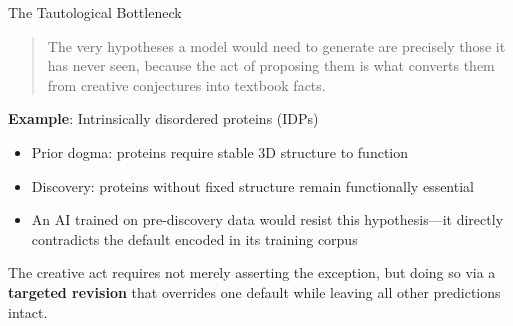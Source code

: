 \documentclass[aspectratio=169]{beamer}
\begin{document}
\begin{frame}{The Tautological Bottleneck}

\begin{quote}
The very hypotheses a model would need to generate are precisely those it has never seen, because the act of proposing them is what converts them from creative conjectures into textbook facts.
\end{quote}

\vspace{0.8em}
\textbf{Example}: Intrinsically disordered proteins (IDPs)

\begin{itemize}
    \item Prior dogma: proteins require stable 3D structure to function
    \item Discovery: proteins without fixed structure remain functionally essential
    \item An AI trained on pre-discovery data would resist this hypothesis---it directly contradicts the default encoded in its training corpus
\end{itemize}

\vspace{0.8em}
The creative act requires not merely asserting the exception, but doing so via a \textbf{targeted revision} that overrides one default while leaving all other predictions intact.
\end{frame}
\end{document}
